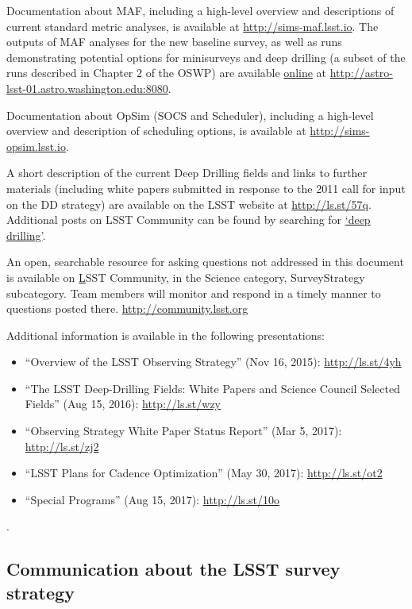 \documentclass[DM,lsstdraft,toc,usenatbib]{lsstdoc}
\begin{document}
Documentation about MAF, including a high-level overview and descriptions of current standard metric analyses, is available at \url{http://sims-maf.lsst.io}. 
The outputs of MAF analyses for the new baseline survey, as well as runs demonstrating potential options for minisurveys and deep drilling (a subset of the runs described in Chapter 2 of the OSWP) are available \href{http://astro-lsst-01.astro.washington.edu:8080}{online} at \url{http://astro-lsst-01.astro.washington.edu:8080}. 

Documentation about OpSim (SOCS and Scheduler), including a high-level overview and description of scheduling options, is available at \url{http://sims-opsim.lsst.io}.

A short description of the current Deep Drilling fields and links to further materials (including white papers submitted in response to the 2011 call for input on the DD strategy) are available on the LSST website at \href{https://www.lsst.org/scientists/survey-design/ddf}{http://ls.st/57q}. Additional posts on LSST Community can be found by searching for \href{https://community.lsst.org/search?q=deep%20drilling}{`deep drilling'}. 

An open, searchable resource for asking questions not addressed in this document is available on \href{http://community.lsst.org}LSST Community, in the Science category, SurveyStrategy subcategory. Team members will monitor and respond in a timely manner to questions posted there.  \url{http://community.lsst.org}

Additional information is available in the following presentations:
\begin{itemize}
\item ``Overview of the LSST Observing Strategy'' (Nov 16, 2015): \url{http://ls.st/4yh}
\item ``The LSST Deep-Drilling Fields: White Papers and Science Council Selected Fields'' (Aug 15, 2016): \url{http://ls.st/wzy}
\item ``Observing Strategy White Paper Status Report'' (Mar 5, 2017): \url{http://ls.st/zj2}
\item ``LSST Plans for Cadence Optimization'' (May 30, 2017): \url{http://ls.st/ot2}
\item ``Special Programs'' (Aug 15, 2017): \url{http://ls.st/10o}
\end{itemize}.


\subsection{Communication about the LSST survey strategy} 
\end{document}

